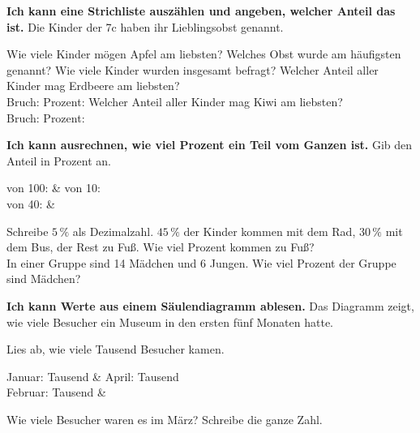 \setcounter{aufgabe}{0}
\zonekopf

\begin{aufgabe}{\textbf{Ich kann eine Strichliste auszählen und angeben, welcher Anteil das ist.} Die Kinder der 7c haben ihr Lieblingsobst genannt.}


\begin{teile}
\teil Wie viele Kinder mögen Apfel am liebsten? \leerfeld
\teil Welches Obst wurde am häufigsten genannt? \leerfeld
\teil Wie viele Kinder wurden insgesamt befragt? \leerfeld
\teil Welcher Anteil aller Kinder mag Erdbeere am liebsten?\\ Bruch: \leerfeld \quad Prozent: \leerfeld[\%]
\teil Welcher Anteil aller Kinder mag Kiwi am liebsten?\\ Bruch: \leerfeld \quad Prozent: \leerfeld[\%]
\end{teile}
\end{aufgabe}

\begin{aufgabe}{\textbf{Ich kann ausrechnen, wie viel Prozent ein Teil vom Ganzen ist.} Gib den Anteil in Prozent an.}
\begin{teilezwei}
 von 100: \leerfeld[\%] &  von 10: \leerfeld[\%] \\
 von 40: \leerfeld[\%] & \\
\end{teilezwei}
\begin{teile}
\teil Schreibe $5\,\%$ als Dezimalzahl. \leerfeld
\teil $45\,\%$ der Kinder kommen mit dem Rad, $30\,\%$ mit dem Bus, der Rest zu Fuß. Wie viel Prozent kommen zu Fuß?\\ \leerfeld[\%]
\teil In einer Gruppe sind 14 Mädchen und 6 Jungen. Wie viel Prozent der Gruppe sind Mädchen?\\ \leerfeld[\%]
\end{teile}
\end{aufgabe}

\begin{aufgabe}{\textbf{Ich kann Werte aus einem Säulendiagramm ablesen.} Das Diagramm zeigt, wie viele Besucher ein Museum in den ersten fünf Monaten hatte.}


Lies ab, wie viele Tausend Besucher kamen.
\begin{teilezwei}
\tz Januar: \leerfeld Tausend & \tz April: \leerfeld Tausend \\
\tz Februar: \leerfeld Tausend & \\
\end{teilezwei}
\begin{teile}
\teil Wie viele Besucher waren es im März? Schreibe die ganze Zahl. \leerfeld
\end{teile}
\end{aufgabe}

